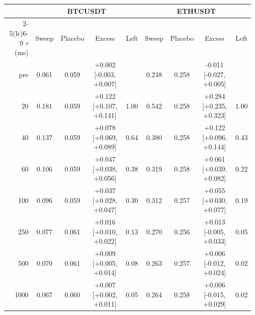 \begin{tabular}{rcccccccc}
\toprule
 & \multicolumn{4}{c}{BTCUSDT} & \multicolumn{4}{c}{ETHUSDT} \\
\cmidrule(lr){2-5}\cmidrule(lr){6-9}
$\tau$ (ms) & Sweep & Placebo & Excess & Left & Sweep & Placebo & Excess & Left \\
\midrule
pre & 0.061 & 0.059 & +0.002 {\scriptsize[-0.003, +0.007]} &  & 0.248 & 0.258 & -0.011 {\scriptsize[-0.027, +0.005]} &  \\
20 & 0.181 & 0.059 & +0.122 {\scriptsize[+0.107, +0.141]} & 1.00 & 0.542 & 0.258 & +0.284 {\scriptsize[+0.235, +0.323]} & 1.00 \\
40 & 0.137 & 0.059 & +0.078 {\scriptsize[+0.069, +0.089]} & 0.64 & 0.380 & 0.258 & +0.122 {\scriptsize[+0.096, +0.144]} & 0.43 \\
60 & 0.106 & 0.059 & +0.047 {\scriptsize[+0.038, +0.056]} & 0.38 & 0.319 & 0.258 & +0.061 {\scriptsize[+0.039, +0.082]} & 0.22 \\
100 & 0.096 & 0.059 & +0.037 {\scriptsize[+0.028, +0.047]} & 0.30 & 0.312 & 0.257 & +0.055 {\scriptsize[+0.030, +0.077]} & 0.19 \\
250 & 0.077 & 0.061 & +0.016 {\scriptsize[+0.010, +0.022]} & 0.13 & 0.270 & 0.256 & +0.013 {\scriptsize[-0.005, +0.033]} & 0.05 \\
500 & 0.070 & 0.061 & +0.009 {\scriptsize[+0.005, +0.014]} & 0.08 & 0.263 & 0.257 & +0.006 {\scriptsize[-0.012, +0.024]} & 0.02 \\
1000 & 0.067 & 0.060 & +0.007 {\scriptsize[+0.002, +0.011]} & 0.05 & 0.264 & 0.258 & +0.006 {\scriptsize[-0.015, +0.029]} & 0.02 \\
\bottomrule
\end{tabular}

